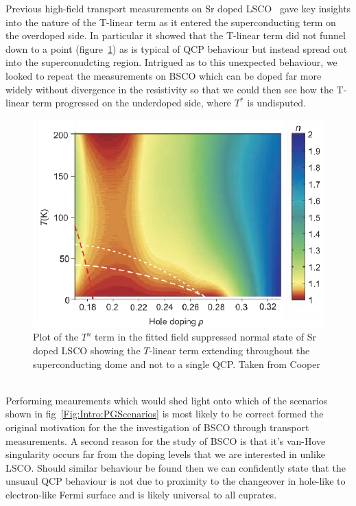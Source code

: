 Previous high-field transport measurements on Sr doped LSCO~\cite{Cooper2009} gave key insights into the nature of the T-linear term as it entered the superconducting term on the overdoped side. In particular it showed that the T-linear term did not funnel down to a point (figure~\ref{Fig:Intro:CooperTLinear}) as is typical of \ac{QCP} behaviour but instead spread out into the superconudcting region. Intrigued as to this unexpected behaviour, we looked to repeat the measurements on \ac{BSCO} which can be doped far more widely without divergence in the resistivity so that we could then see how the T-linear term progressed on the underdoped side, where $T^*$ is undisputed.
\begin{figure}[htbp]
    \begin{center}
        \includegraphics[scale=0.8]{Chapter-Introduction/Figures/CooperTLinear/CooperTLinear}
        \caption{Plot of the $T^n$ term in the fitted field suppressed normal state of Sr doped LSCO showing the $T$-linear term extending throughout the superconducting dome and not to a single \ac{QCP}. Taken from Cooper \etal~\cite{Cooper2009}}
        \label{Fig:Intro:CooperTLinear}
    \end{center}
\end{figure}
Performing meaurements which would shed light onto which of the scenarios shown in fig~\ref{Fig:Intro:PGScenarios} is most likely to be correct formed the original motivation for the the investigation of \ac{BSCO} through transport measurements. A second reason for the study of \ac{BSCO} is that it's van-Hove singularity occurs far from the doping levels that we are interested in unlike LSCO. Should similar behaviour be found then we can confidently state that the unsuaul \ac{QCP} behaviour is not due to proximity to the changeover in hole-like to electron-like Fermi surface and is likely universal to all cuprates. 


